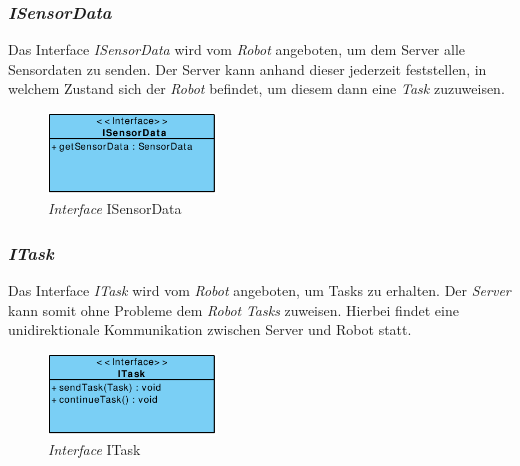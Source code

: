 	\subsubsection{\textit{ISensorData}}
	Das Interface \textit{ISensorData} wird vom \textit{Robot} angeboten, um dem Server alle Sensordaten zu senden. Der Server kann anhand dieser jederzeit feststellen, in welchem Zustand sich der \textit{Robot} befindet, um diesem dann eine \textit{Task} zuzuweisen.
	\begin{figure}[H]
	\centering
	\includegraphics[width=0.4\textwidth]{img/1-Entwurf-3-1_ISensorData}
	\caption{\textit{Interface} ISensorData}
	\label{ISensorData}
	\end{figure}

	\subsubsection{\textit{ITask}}
	Das Interface \textit{ITask} wird vom \textit{Robot} angeboten, um Tasks zu erhalten. Der \emph{Server} kann somit ohne Probleme dem \textit{Robot} \textit{Tasks} zuweisen. Hierbei findet eine unidirektionale Kommunikation zwischen Server und Robot statt.
	\begin{figure}[H]
	\centering
	\includegraphics[width=0.4\textwidth]{img/1-Entwurf-3-1_ITask}
	\caption{\textit{Interface} ITask}
	\label{ITask}
	\end{figure}

